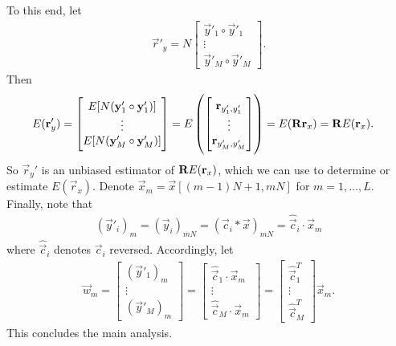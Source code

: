 \documentclass[a4paper, openany, oneside]{memoir}
\begin{document}
To this end, let
\begin{align*}
    \vec{r}'_y = N \begin{bmatrix}
        \vec{y}'_1 \circ \vec{y}'_1 \\
        \vdots \\
        \vec{y}'_M \circ \vec{y}'_M
    \end{bmatrix}.
\end{align*}
Then
\begin{align*}
    E(\boldsymbol{\mathbf{r}}'_y) &= \begin{bmatrix}
        E[N(\boldsymbol{\mathbf{y}}'_1 \circ \boldsymbol{\mathbf{y}}'_1)] \\
        \vdots \\
        E[N(\boldsymbol{\mathbf{y}}'_M \circ \boldsymbol{\mathbf{y}}'_M)]
    \end{bmatrix}
    = E\left(\begin{bmatrix}
        \boldsymbol{\mathbf{r}}_{y'_1,y'_1} \\
        \vdots \\
        \boldsymbol{\mathbf{r}}_{y'_M,y'_M} \\
    \end{bmatrix}\right) = E(\boldsymbol{\mathbf{R}} \boldsymbol{\mathbf{r}}_x) = \boldsymbol{\mathbf{R}} E(\boldsymbol{\mathbf{r}}_x).
\end{align*}
So $\vec{r}_y'$ is an unbiased estimator of $\boldsymbol{\mathbf{R}} E(\boldsymbol{\mathbf{r}}_x)$, which we can use to determine or estimate $E(\vec{r}_x)$. Denote $\vec{x}_m = \vec{x}[(m-1)N+1,mN]$ for $m = 1,\ldots,L$. Finally, note that
\begin{align*}
    (\vec{y}'_i)_m = (\vec{y}_i)_{mN} = (\vec{c}_i \ast \vec{x})_{mN} = \hat{\vec{c}}_i \cdot \vec{x}_m
\end{align*}
where $\hat{\vec{c}}_i$ denotes $\vec{c}_i$ reversed. Accordingly, let
\begin{align*}
    \vec{w}_m = \begin{bmatrix}
        (\vec{y}'_1)_m \\
        \vdots \\
        (\vec{y}'_M)_m
    \end{bmatrix} = \begin{bmatrix}
        \hat{\vec{c}}_1 \cdot \vec{x}_m \\
        \vdots \\
        \hat{\vec{c}}_M \cdot \vec{x}_m
    \end{bmatrix} = \begin{bmatrix}
        \hat{\vec{c}}_1^T\\
        \vdots \\
        \hat{\vec{c}}_M^T
    \end{bmatrix} \vec{x}_m.
\end{align*}
This concludes the main analysis.
\end{document}
